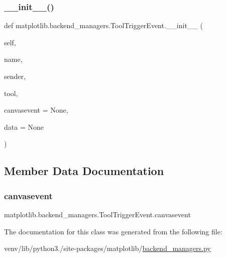 \subsubsection{\texorpdfstring{\+\_\+\+\_\+init\+\_\+\+\_\+()}{\_\_init\_\_()}}
{\footnotesize\ttfamily def matplotlib.\+backend\+\_\+managers.\+Tool\+Trigger\+Event.\+\_\+\+\_\+init\+\_\+\+\_\+ (\begin{DoxyParamCaption}\item[{}]{self,  }\item[{}]{name,  }\item[{}]{sender,  }\item[{}]{tool,  }\item[{}]{canvasevent = {\ttfamily None},  }\item[{}]{data = {\ttfamily None} }\end{DoxyParamCaption})}



\subsection{Member Data Documentation}
\mbox{\label{classmatplotlib_1_1backend__managers_1_1ToolTriggerEvent_a3197c069e8d074b0a1c9626cefa14af1}} 
\subsubsection{\texorpdfstring{canvasevent}{canvasevent}}
{\footnotesize\ttfamily matplotlib.\+backend\+\_\+managers.\+Tool\+Trigger\+Event.\+canvasevent}



The documentation for this class was generated from the following file\+:\begin{DoxyCompactItemize}
\item 
venv/lib/python3./site-\/packages/matplotlib/\hyperlink{backend__managers_8py}{backend\+\_\+managers.\+py}\end{DoxyCompactItemize}
